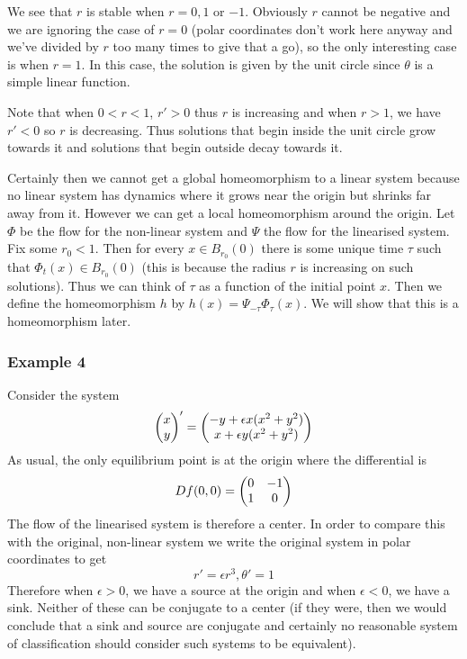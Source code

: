 We see that $r$ is stable when $r = 0, 1$ or $-1$. Obviously $r$ cannot be negative and we are ignoring the case of $r = 0$ (polar coordinates don't work here anyway and we've divided by $r$ too many times to give that a go), so the only interesting case is when $r = 1$. In this case, the solution is given by the unit circle since $\theta$ is a simple linear function.

Note that when $0 < r < 1$, $r' > 0$ thus $r$ is increasing and when $r > 1$, we have $r' < 0$ so $r$ is decreasing. Thus solutions that begin inside the unit circle grow towards it and solutions that begin outside decay towards it. 


Certainly then we cannot get a global homeomorphism to a linear system because no linear system has dynamics where it grows near the origin but shrinks far away from it. However we can get a local homeomorphism around the origin. Let $\Phi$ be the flow for the non-linear system and $\Psi$ the flow for the linearised system. Fix some $r_0  < 1$. Then for every $x \in B_{r_0}(0)$ there is some unique time $\tau$ such that $\Phi_t(x) \in B_{r_0}(0)$ (this is because the radius $r$ is increasing on such solutions). Thus we can think of $\tau$ as a function of the initial point $x$. Then we define the homeomorphism $h$ by $h(x) = \Psi_{-\tau}\Phi_{\tau}(x)$. We will show that this is a homeomorphism later.


\subsubsection{Example 4}
Consider the system
$$ \begin{pmatrix} x\\y \end{pmatrix}' = \begin{pmatrix} -y + \epsilon x(x^2 + y^2)\\x + \epsilon y(x^2 + y^2) \end{pmatrix} $$
As usual, the only equilibrium point is at the origin where the differential is
$$ Df(0, 0) = \begin{pmatrix} 0 & -1\\1 & 0 \end{pmatrix} $$
The flow of the linearised system is therefore a center. In order to compare this with the original, non-linear system we write the original system in polar coordinates to get
$$ r' = \epsilon r^3, \theta' = 1 $$
Therefore when $\epsilon > 0$, we have a source at the origin and when $\epsilon  < 0$, we have a sink. Neither of these can be conjugate to a center (if they were, then we would conclude that a sink and source are conjugate and certainly no reasonable system of classification should consider such systems to be equivalent).

